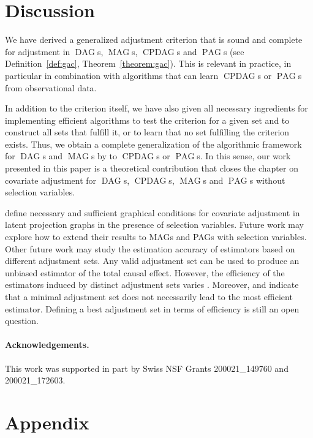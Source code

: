 \documentclass[11pt,a4paper]{article}
\DeclareMathOperator{\CPDAG}{CPDAG}
\DeclareMathOperator{\DAG}{DAG}
\DeclareMathOperator{\MAG}{MAG}
\DeclareMathOperator{\PAG}{PAG}
\begin{document}
\section{Discussion} \label{sec:discussion}

We have derived a generalized adjustment criterion that is sound and complete for adjustment in $\DAG$s,
$\MAG$s, $\CPDAG$s and $\PAG$s (see Definition~\ref{def:gac}, Theorem~\ref{theorem:gac}). 
This is relevant in practice,
in particular in combination with algorithms that can learn $\CPDAG$s or $\PAG$s from observational data.

In addition to the criterion itself, we have also given all necessary ingredients for implementing efficient algorithms to test the criterion for a given set and to construct all sets that fulfill it, or to learn that no set fulfilling the criterion exists. Thus, we obtain a complete generalization of the algorithmic framework for $\DAG$s and $\MAG$s by \citet{vanconstructing} to $\CPDAG$s or $\PAG$s.
In this sense, our work presented in this paper is a theoretical contribution that closes the chapter on covariate adjustment for $\DAG$s, $\CPDAG$s, $\MAG$s and $\PAG$s without selection variables.


 \cite{correa2017causal} define necessary and sufficient graphical conditions for covariate adjustment in latent projection graphs in the presence of selection variables. Future work may explore how to extend their results to MAGs and PAGs with selection variables. 
Other future work may study the estimation accuracy of estimators based on different adjustment sets.
Any valid adjustment set can be used to produce an unbiased estimator of the total causal effect. However, the efficiency of the estimators induced by distinct adjustment sets varies \citep{greenland1999causal,kuroki2003covariate,kuroki04selection,hahn2004functional,hahn1998role,guo2010sufficient,DeLunaEtAl11}. Moreover, \cite{kuroki2003covariate} and \cite{kuroki04selection} indicate that a minimal adjustment set does not necessarily lead to the most efficient estimator.  
Defining a best adjustment set in terms of efficiency is still an open question.


\paragraph*{Acknowledgements.} This work was supported in part by Swiss NSF Grants 200021\_149760 and 200021\_172603.

\section*{Appendix}
\end{document}
